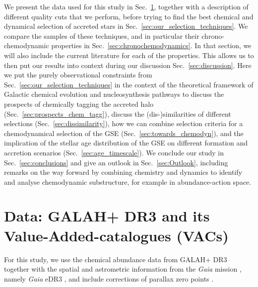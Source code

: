 \documentclass[fleqn,usenatbib]{mnras}
\newcommand{\Gaia}{\textit{Gaia}\xspace} %
\begin{document}
We present the data used for this study in Sec.~\ref{sec:data}, together with a description of different quality cuts that we perform, before trying to find the best chemical and dynamical selection of accreted stars in Sec.~\ref{sec:our_selection_techniques}. We compare the samples of these techniques, and in particular their chrono-chemodynamic properties in Sec.~\ref{sec:chronochemodynamics}. In that section, we will also include the current literature for each of the properties. This allows us to then put our results into context during our discussion Sec.~\ref{sec:discussion}. Here we put the purely observational constraints from Sec.~\ref{sec:our_selection_techniques} in the context of the theoretical framework of Galactic chemical evolution and nucleosynthesis pathways to discuss the prospects of chemically tagging the accreted halo (Sec.~\ref{sec:prospects_chem_tagg}), discuss the (dis-)similarities of different selections (Sec.~\ref{sec:dissimilarity}), how we can combine selection criteria for a chemodynamical selection of the GSE (Sec.~\ref{sec:towards_chemodyn}), and the implication of the stellar age distribution of the GSE on different formation and accretion scenarios (Sec.~\ref{sec:age_timescale}). We conclude our study in Sec.~\ref{sec:conclusions} and give an outlook in Sec.~\ref{sec:Outlook}, including remarks on the way forward by combining chemistry and dynamics to identify and analyse chemodynamic substructure, for example in abundance-action space.

\section{Data: GALAH+ DR3 and its Value-Added-catalogues (VACs)} \label{sec:data}

For this study, we use the chemical abundance data from GALAH+ DR3 \citep{Buder2021} together with the spatial and astrometric information from the \Gaia mission \citep{Gaia-Collaboration2016}, namely \Gaia eDR3 \citep{Brown2021}, and include  corrections of parallax zero points \citep{Lindegren2021a, Lindegren2021b}.
\end{document}
